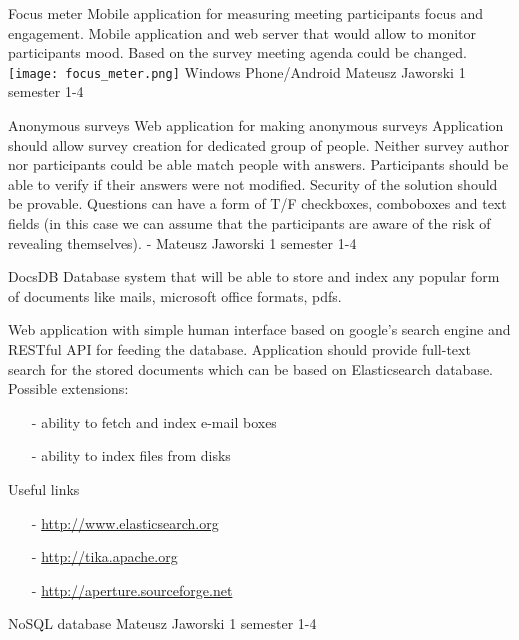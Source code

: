 \begin{project}
{Focus meter}
{Mobile application for measuring meeting participants focus and engagement.}
{
Mobile application and web server that would allow to
monitor participants mood. Based on the survey meeting
agenda could be changed.
\texttt{[image: focus\_meter.png]}
}
{Windows Phone/Android}
{Mateusz Jaworski}
{1 semester}
{1-4}
\end{project}
\begin{project}
{Anonymous surveys}
{Web application for making anonymous surveys}
{
Application should allow survey creation for dedicated group of people. 
Neither survey author nor participants could be able match people with answers.
Participants should be able to verify if their answers were not modified. 
Security of the solution should be provable. Questions can have a form of T/F
checkboxes, comboboxes and text fields (in this case we can assume that the
participants are aware of the risk of revealing themselves).
}
{-}
{Mateusz Jaworski}
{1 semester}
{1-4}
\end{project}
\begin{project}
{DocsDB}
{Database system that will be able to store and index any popular form of
documents like mails, microsoft office formats, pdfs.}
{
Web application with simple human interface based on google's search engine and
RESTful API for feeding the database.
Application should provide full-text search for the stored documents which can be based on Elasticsearch database.
Possible extensions:
\begin{itemize}
  \item[-] ability to fetch and index e-mail boxes
  \item[-] ability to index files from disks
\end{itemize}
Useful links
\begin{itemize}
  \item[-] \url{http://www.elasticsearch.org}
  \item[-] \url{http://tika.apache.org}
  \item[-] \url{http://aperture.sourceforge.net}
\end{itemize}
}
{NoSQL database}
{Mateusz Jaworski}
{1 semester}
{1-4}
\end{project}
